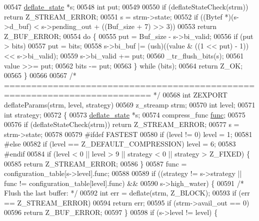 \begin{DoxyCode}
00547     \hyperlink{structinternal__state}{deflate\_state} *s;
00548     \textcolor{keywordtype}{int} put;
00549 
00550     \textcolor{keywordflow}{if} (deflateStateCheck(strm)) \textcolor{keywordflow}{return} Z\_STREAM\_ERROR;
00551     s = strm->state;
00552     \textcolor{keywordflow}{if} ((Bytef *)(s->d\_buf) < s->pending\_out + ((Buf\_size + 7) >> 3))
00553         \textcolor{keywordflow}{return} Z\_BUF\_ERROR;
00554     \textcolor{keywordflow}{do} \{
00555         put = Buf\_size - s->bi\_valid;
00556         \textcolor{keywordflow}{if} (put > bits)
00557             put = bits;
00558         s->bi\_buf |= (ush)((value & ((1 << put) - 1)) << s->bi\_valid);
00559         s->bi\_valid += put;
00560         \_tr\_flush\_bits(s);
00561         value >>= put;
00562         bits -= put;
00563     \} \textcolor{keywordflow}{while} (bits);
00564     \textcolor{keywordflow}{return} Z\_OK;
00565 \}
00566 
00567 \textcolor{comment}{/* ========================================================================= */}
00568 \textcolor{keywordtype}{int} ZEXPORT deflateParams(strm, level, strategy)
00569     z\_streamp strm;
00570     \textcolor{keywordtype}{int} level;
00571     \textcolor{keywordtype}{int} strategy;
00572 \{
00573     \hyperlink{structinternal__state}{deflate\_state} *s;
00574     compress\_func \hyperlink{structfunc}{func};
00575 
00576     \textcolor{keywordflow}{if} (deflateStateCheck(strm)) \textcolor{keywordflow}{return} Z\_STREAM\_ERROR;
00577     s = strm->state;
00578 
00579 \textcolor{preprocessor}{#ifdef FASTEST}
00580     \textcolor{keywordflow}{if} (level != 0) level = 1;
00581 \textcolor{preprocessor}{#else}
00582     \textcolor{keywordflow}{if} (level == Z\_DEFAULT\_COMPRESSION) level = 6;
00583 \textcolor{preprocessor}{#endif}
00584     \textcolor{keywordflow}{if} (level < 0 || level > 9 || strategy < 0 || strategy > Z\_FIXED) \{
00585         \textcolor{keywordflow}{return} Z\_STREAM\_ERROR;
00586     \}
00587     func = configuration\_table[s->level].func;
00588 
00589     \textcolor{keywordflow}{if} ((strategy != s->strategy || func != configuration\_table[level].func) &&
00590         s->high\_water) \{
00591         \textcolor{comment}{/* Flush the last buffer: */}
00592         \textcolor{keywordtype}{int} err = deflate(strm, Z\_BLOCK);
00593         \textcolor{keywordflow}{if} (err == Z\_STREAM\_ERROR)
00594             \textcolor{keywordflow}{return} err;
00595         \textcolor{keywordflow}{if} (strm->avail\_out == 0)
00596             \textcolor{keywordflow}{return} Z\_BUF\_ERROR;
00597     \}
00598     \textcolor{keywordflow}{if} (s->level != level) \{

\end{DoxyCode}
